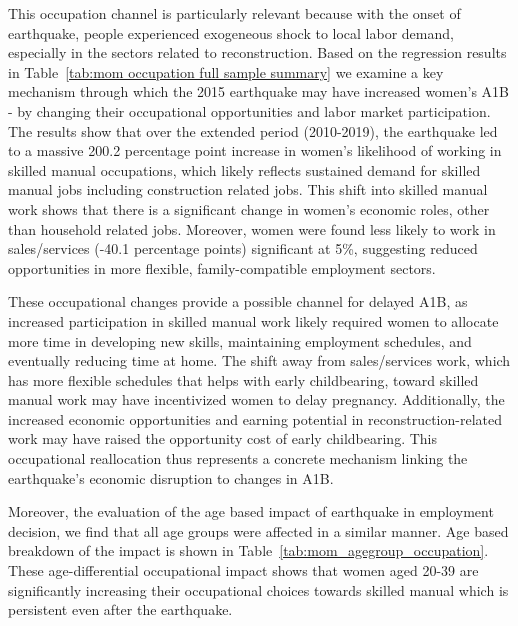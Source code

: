 \documentclass[11pt,a4paper]{article}
\begin{document}
\vspace{0.25 cm}
This occupation channel is particularly relevant because with the onset of earthquake, people experienced exogeneous shock to local labor demand, especially in the sectors related to reconstruction.
Based on the regression results in Table~\ref{tab:mom occupation full sample summary} we examine a key mechanism through which the 2015 earthquake may have increased women's A1B - by changing their occupational opportunities and labor market participation. The results show that over the extended period (2010-2019), the earthquake led to a massive 200.2 percentage point increase in women's likelihood of working in skilled manual occupations, which likely reflects sustained demand for skilled manual jobs including construction related jobs. This shift into skilled manual work shows that there is a significant change in women's economic roles, other than household related jobs. Moreover, women were found less likely to work in sales/services (-40.1 percentage points) significant at 5\%, suggesting reduced opportunities in more flexible, family-compatible employment sectors.

\vspace{0.25cm}


These occupational changes provide a possible channel for delayed A1B, as increased participation in skilled manual work likely required women to allocate more time in developing new skills, maintaining employment schedules, and eventually reducing time at home. The shift away from sales/services work, which has more flexible schedules that helps with early childbearing, toward skilled manual work may have incentivized women to delay pregnancy. Additionally, the increased economic opportunities and earning potential in reconstruction-related work may have raised the opportunity cost of early childbearing. This occupational reallocation thus represents a concrete mechanism linking the earthquake's economic disruption to changes in A1B.

\vspace{0.25cm}

Moreover, the evaluation of the age based impact of earthquake in employment decision, we find that all age groups were affected in a similar manner. Age based breakdown of the impact is shown in Table~\ref{tab:mom_agegroup_occupation}. These age-differential occupational impact shows that women aged 20-39 are significantly increasing their occupational choices towards skilled manual which is persistent even after the earthquake.
\end{document}

